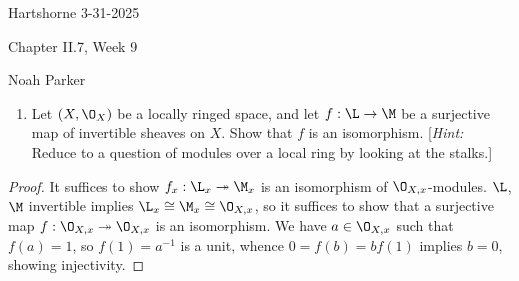 \documentclass[12pt]{amsart}
\begin{document}
{Hartshorne} \hfill {3-31-2025}

\bigskip\bigskip

\begin{center}

{\sc Chapter II.7, Week 9}

\end{center}

\begin{center}

  {Noah Parker} %
    
\end{center}

\bigskip\bigskip

\begin{enumerate}
  \item[7.1.] {
      Let $(X,\O_X)$ be a locally ringed space, and let $f:\L\to \M$ be a surjective map of invertible sheaves on $X$.
      Show that $f$ is an isomorphism.
      [\emph{Hint:} Reduce to a question of modules over a local ring by looking at the stalks.]
    }
\end{enumerate}

\begin{proof}
  It suffices to show $f_x:\L_x\twoheadrightarrow \M_x$ is an isomorphism of $\O_{X,x}$-modules.
  $\L$, $\M$ invertible implies $\L_x\cong \M_x\cong \O_{X,x}$, so it suffices to show that a surjective map $f:\O_{X,x}\twoheadrightarrow\O_{X,x}$ is an isomorphism.
  We have $a\in \O_{X,x}$ such that $f(a) = 1$, so $f(1)=a^{-1}$ is a unit, whence $0=f(b)=bf(1)$ implies $b=0$, showing injectivity.
\end{proof}

% 
\end{document}
